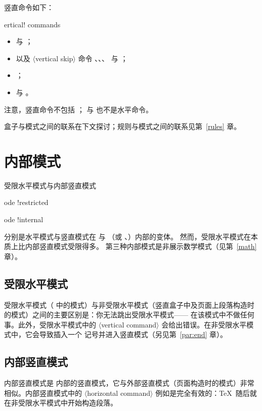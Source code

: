 \documentclass[a4paper]{rapport3}
\def\gr#1{$\langle$#1$\rangle$}\def\key#1{{\tt#1}}
\def\gram#1{\gr{#1}}%
\def\term#1\par{\index{#1}}
\begin{document}
竖直命令如下：
\label{v:com:list}\term vertical! commands\par
\begin{itemize}
\item {} 与 ；
\item {} 以及 \gr{vertical skip} 命令
 、、、 与 ；
\item {}；
\item {} 与 。
\end{itemize}
注意，竖直命令不包括 ； 与  也不是水平命令。

盒子与模式之间的联系在下文探讨；规则与模式之间的联系见第~\ref{rules} 章。

\section{内部模式}

受限水平模式与内部竖直模式
\term mode !restricted\par\term mode !internal\par
分别是水平模式与竖直模式在  与 （或 、）内部的变体。
然而，受限水平模式在本质上比内部竖直模式受限得多。
第三种内部模式是非展示数学模式（见第~\ref{math} 章）。

\subsection{受限水平模式}

受限水平模式（ 中的模式）与非受限水平模式（竖直盒子中及页面上段落构造时的模式）之间的主要区别是：你无法跳出受限水平模式—— 在该模式中不做任何事。此外，受限水平模式中的 \gram{vertical command} 会给出错误。在非受限水平模式中，它会导致插入一个  记号并进入竖直模式（另见第~\ref{par:end} 章）。
\awp

\subsection{内部竖直模式}

内部竖直模式是  内部的竖直模式，它与外部竖直模式（页面构造时的模式）非常相似。内部竖直模式中的 \gram{horizontal command} 例如是完全有效的：\TeX\ 随后就在非受限水平模式中开始构造段落。
\end{document}
